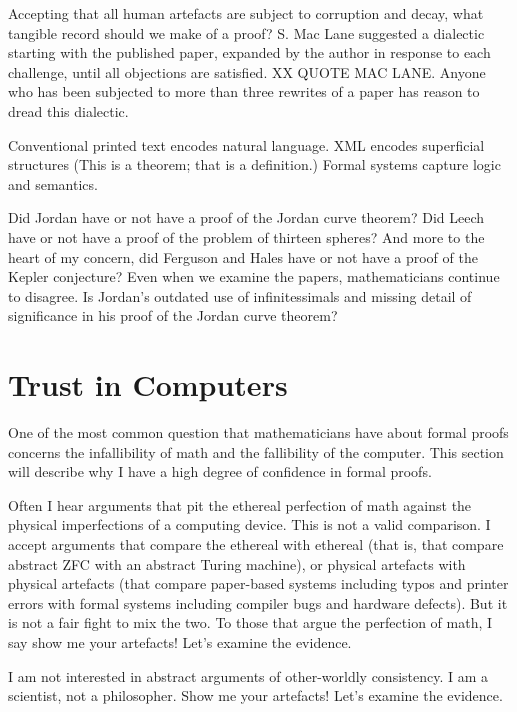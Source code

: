 \documentclass{llncs}
\begin{document}
Accepting that all human artefacts are subject to corruption and
decay, what tangible record should we make of a proof?
S. Mac Lane suggested a dialectic
starting with the published paper,  expanded by the
author in response to each challenge, until all objections are satisfied.
XX QUOTE MAC LANE.
Anyone who has been subjected to more than three rewrites of a paper has reason to dread this dialectic.

Conventional printed text encodes natural language.  
XML encodes superficial structures
(This is a theorem; that is a definition.)  Formal systems capture logic and
semantics.



Did Jordan have or not have a proof of the Jordan curve theorem?
Did Leech have or not have a proof of the problem of thirteen spheres?
And more to the heart of my concern, 
did Ferguson and Hales have or not have a proof of the Kepler conjecture?
Even when we examine the papers, mathematicians continue to disagree.
Is Jordan's  outdated use of infinitessimals and
missing detail of significance in his proof of the Jordan curve theorem?

\section{Trust in Computers}

One of the most common question that mathematicians have about formal proofs concerns
the infallibility of math and the fallibility of the computer.  This section will
describe why I have a high degree of confidence in formal proofs.

Often I hear arguments that pit the ethereal perfection of math against the physical
imperfections of a computing device.
This is not a valid comparison.  I accept arguments that compare the ethereal with
ethereal (that is, that compare abstract ZFC with an abstract Turing machine),
or physical artefacts with physical artefacts (that compare paper-based
systems including typos and printer errors with formal systems including compiler bugs and hardware defects).  But it is not a fair fight to mix the two.  To those that argue the perfection of math, I say show me your artefacts!  Let's examine the evidence.

I am not interested in abstract arguments of other-worldly consistency.  I am a
scientist, not a philosopher.  Show me your artefacts!  Let's examine the evidence.
\end{document}
